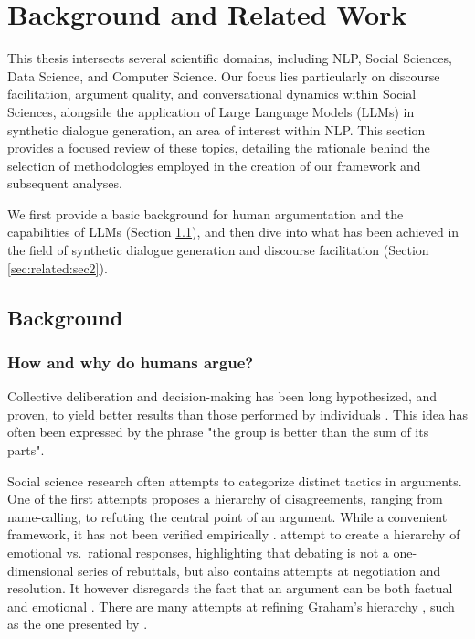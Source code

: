 %
\chapter{Background and Related Work}
\label{sec:related}

This thesis intersects several scientific domains, including \ac{NLP}, Social Sciences, Data Science, and Computer Science. Our focus lies particularly on discourse facilitation, argument quality, and conversational dynamics within Social Sciences, alongside the application of Large Language Models (LLMs) in synthetic dialogue generation, an area of interest within \ac{NLP}. This section provides a focused review of these topics, detailing the rationale behind the selection of methodologies employed in the creation of our framework and subsequent analyses. 

We first provide a basic background for human argumentation and the capabilities of LLMs (Section \ref{sec:related:sec1}), and then dive into what has been achieved in the field of synthetic dialogue generation and discourse facilitation (Section \ref{sec:related:sec2}).


\section{Background}
\label{sec:related:sec1}

\subsection{How and why do humans argue?}
\label{sec:background:arguments-how}

Collective deliberation and decision-making has been long hypothesized, and proven, to yield better results than those performed by individuals \cite{david-collaborative, stefan-dissent}. This idea has often been expressed by the phrase "the group is better than the sum of its parts". 

Social science research often attempts to categorize distinct tactics in arguments. One of the first attempts \cite{graham2008disagree} proposes a hierarchy of disagreements, ranging from name-calling, to refuting the central point of an argument. While a convenient framework, it has not been verified empirically \cite{dekock2022disagree}. \citet{walker-etal-2012-corpus} attempt to create a hierarchy of emotional vs.\ rational responses, highlighting that debating is not a one-dimensional series of rebuttals, but also contains attempts at negotiation and resolution. It however disregards the fact that an argument can be both factual and emotional \cite{dekock2022disagree}. There are many attempts at refining Graham's hierarchy \cite{graham2008disagree}, such as the one presented by \citet{benesch2016counterspeech}.

